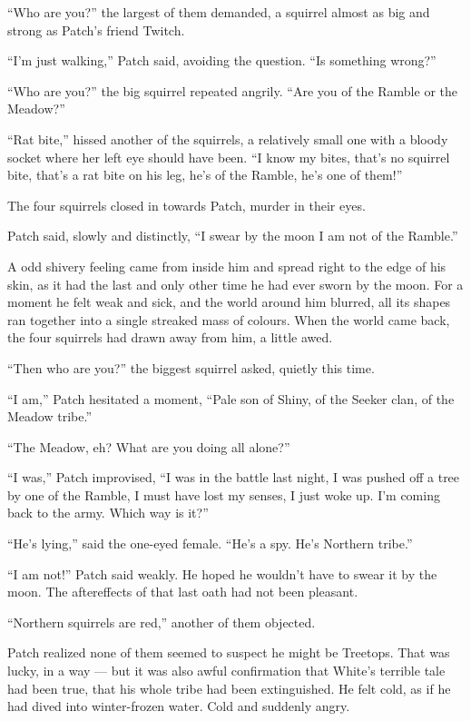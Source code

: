 \documentclass[ebook,oneside,openany,12pt]{memoir}
\begin{document}
“Who are you?” the largest of them demanded, a squirrel almost as big
and strong as Patch’s friend Twitch.

“I’m just walking,” Patch said, avoiding the question. “Is something
wrong?”

“Who are you?” the big squirrel repeated angrily. “Are you of the
Ramble or the Meadow?”

“Rat bite,” hissed another of the squirrels, a relatively small one
with a bloody socket where her left eye should have been. “I know my
bites, that’s no squirrel bite, that’s a rat bite on his leg, he’s of
the Ramble, he’s one of them!”

The four squirrels closed in towards Patch, murder in their eyes.

Patch said, slowly and distinctly, “I swear by the moon I am not of
the Ramble.”

A odd shivery feeling came from inside him and spread right to the
edge of his skin, as it had the last and only other time he had ever
sworn by the moon. For a moment he felt weak and sick, and the world
around him blurred, all its shapes ran together into a single streaked
mass of colours. When the world came back, the four squirrels had
drawn away from him, a little awed.

“Then who are you?” the biggest squirrel asked, quietly this time.

“I am,” Patch hesitated a moment, “Pale son of Shiny, of the Seeker
clan, of the Meadow tribe.”

“The Meadow, eh? What are you doing all alone?”

“I was,” Patch improvised, “I was in the battle last night, I was
pushed off a tree by one of the Ramble, I must have lost my senses, I
just woke up. I’m coming back to the army. Which way is it?”

“He’s lying,” said the one-eyed female. “He’s a spy. He’s Northern
tribe.”

“I am not!” Patch said weakly. He hoped he wouldn’t have to swear it
by the moon. The aftereffects of that last oath had not been pleasant.

“Northern squirrels are red,” another of them objected.

Patch realized none of them seemed to suspect he might be
Treetops. That was lucky, in a way — but it was also awful
confirmation that White’s terrible tale had been true, that his whole
tribe had been extinguished. He felt cold, as if he had dived into
winter-frozen water. Cold and suddenly angry.
\end{document}
